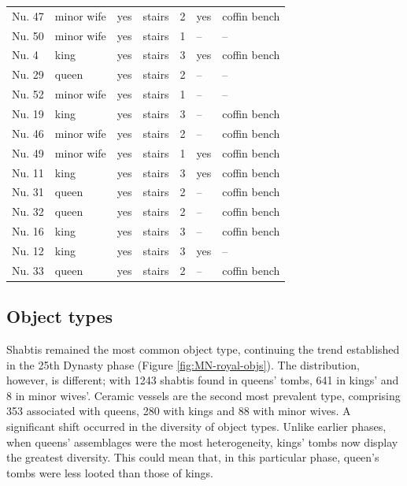 {\begin{xltabular}{\textwidth}{X X X X X X X}
		\cmidrule(r){1-7}
		Nu. 47 & minor wife & yes & stairs & 2 & yes & coffin bench \\
		\cmidrule(r){1-7}
		Nu. 50 & minor wife & yes & stairs & 1 & -- & -- \\
		\cmidrule(r){1-7}
		Nu. 4 & king & yes & stairs & 3 & yes & coffin bench \\
		\cmidrule(r){1-7}
		Nu. 29 & queen & yes & stairs & 2 & -- & -- \\
		\cmidrule(r){1-7}
		Nu. 52 & minor wife & yes & stairs & 1 & -- & -- \\
		\cmidrule(r){1-7}
		Nu. 19 & king & yes & stairs & 3 & -- & coffin bench \\
		\cmidrule(r){1-7}
		Nu. 46 & minor wife & yes & stairs & 2 & -- & coffin bench \\
		\cmidrule(r){1-7}
		Nu. 49 & minor wife & yes & stairs & 1 & yes & coffin bench \\
		\cmidrule(r){1-7}
		Nu. 11 & king & yes & stairs & 3 & yes & coffin bench \\
		\cmidrule(r){1-7}
		Nu. 31 & queen & yes & stairs & 2 & -- & coffin bench \\
		\cmidrule(r){1-7}
		Nu. 32 & queen & yes & stairs & 2 & -- & coffin bench \\
		\cmidrule(r){1-7}
		Nu. 16 & king & yes & stairs & 3 & -- & coffin bench \\
		\cmidrule(r){1-7}
		Nu. 12 & king & yes & stairs & 3 & yes & -- \\
		\cmidrule(r){1-7}
		Nu. 33 & queen & yes & stairs & 2 & -- & coffin bench \\
	\end{xltabular}
}


\subsection{Object types}


Shabtis remained the most common object type, continuing the trend established in the 25th Dynasty phase (Figure \ref{fig:MN-royal-objs}). The distribution, however, is different; with 1243 shabtis found in queens' tombs, 641 in kings' and 8 in minor wives'. Ceramic vessels are the second most prevalent type, comprising 353 associated with queens, 280 with kings and 88 with minor wives. A significant shift occurred in the diversity of object types. Unlike earlier phases, when queens' assemblages were the most heterogeneity, kings' tombs now display the greatest diversity. This could mean that, in this particular phase, queen's tombs were less looted than those of kings.


